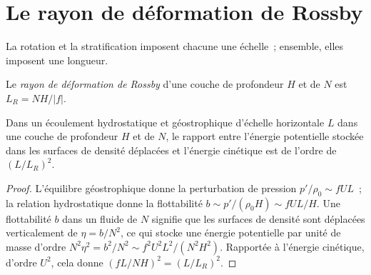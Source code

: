 \section{Le rayon de déformation de Rossby}\label{sec:b3:gfd-foundations:rossby-radius}

La rotation et la stratification imposent chacune une échelle~; ensemble, elles imposent une
longueur.

\begin{definition}\label{def:b3:gfd-foundations:rossby-radius}
Le \emph{rayon de déformation de Rossby}
d'une couche de profondeur $H$ et de  $N$ est $L_R = NH/|f|$.
\end{definition}

\begin{proposition}\label{prop:b3:gfd-foundations:rossby-radius}
Dans un écoulement hydrostatique et géostrophique d'échelle horizontale $L$ dans une couche de
profondeur $H$ et de  $N$, le rapport entre l'énergie potentielle
stockée dans les surfaces de densité déplacées et l'énergie cinétique est de l'ordre de
$(L/L_R)^2$.
\end{proposition}

\begin{proof}
L'équilibre géostrophique donne la perturbation de pression $p'/\rho_0 \sim fUL$~; la
relation hydrostatique donne la flottabilité $b \sim p'/(\rho_0H) \sim fUL/H$. Une
flottabilité $b$ dans un fluide de  $N$ signifie que les surfaces de densité
sont déplacées verticalement de $\eta = b/N^2$, ce qui stocke une énergie potentielle
par unité de masse d'ordre $N^2\eta^2 = b^2/N^2 \sim f^2U^2L^2/(N^2H^2)$. Rapportée
à l'énergie cinétique, d'ordre $U^2$, cela donne $(fL/NH)^2 = (L/L_R)^2$.
\end{proof}

